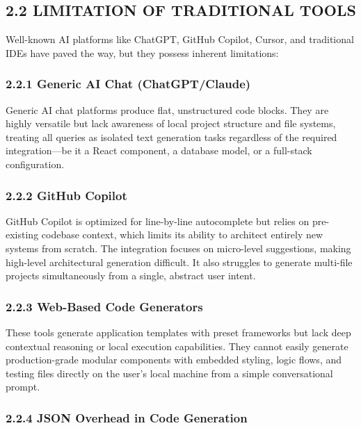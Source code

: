 \documentclass[
  12pt,
]{article}
\begin{document}
\subsection{2.2 LIMITATION OF TRADITIONAL
TOOLS}\label{limitation-of-traditional-tools}

Well-known AI platforms like ChatGPT, GitHub Copilot, Cursor, and
traditional IDEs have paved the way, but they possess inherent
limitations:

\subsubsection{2.2.1 Generic AI Chat
(ChatGPT/Claude)}\label{generic-ai-chat-chatgptclaude}

Generic AI chat platforms produce flat, unstructured code blocks. They
are highly versatile but lack awareness of local project structure and
file systems, treating all queries as isolated text generation tasks
regardless of the required integration---be it a React component, a
database model, or a full-stack configuration.

\subsubsection{2.2.2 GitHub Copilot}\label{github-copilot}

GitHub Copilot is optimized for line-by-line autocomplete but relies on
pre-existing codebase context, which limits its ability to architect
entirely new systems from scratch. The integration focuses on
micro-level suggestions, making high-level architectural generation
difficult. It also struggles to generate multi-file projects
simultaneously from a single, abstract user intent.

\subsubsection{2.2.3 Web-Based Code
Generators}\label{web-based-code-generators}

These tools generate application templates with preset frameworks but
lack deep contextual reasoning or local execution capabilities. They
cannot easily generate production-grade modular components with embedded
styling, logic flows, and testing files directly on the user's local
machine from a simple conversational prompt.

\subsubsection{2.2.4 JSON Overhead in Code
Generation}\label{json-overhead-in-code-generation}
\end{document}
